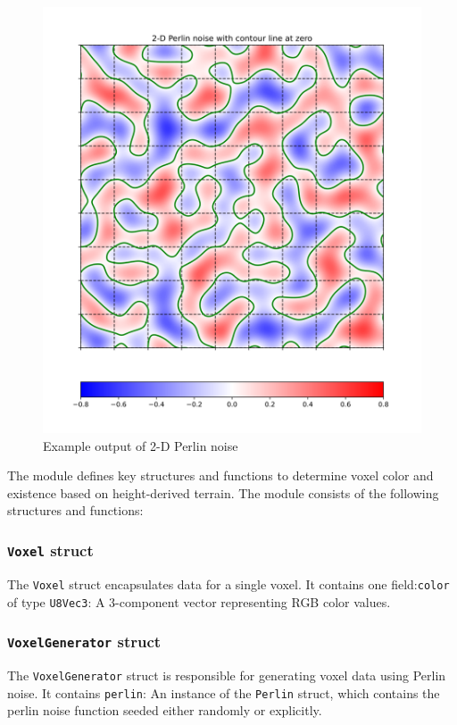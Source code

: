 \documentclass[conference]{IEEEtran}
\begin{document}
\begin{figure}[htbp]
\centerline{\includegraphics[width=\linewidth]{perlin-noise}}
\caption{Example output of 2-D Perlin noise}
\label{perlin-noise}
\end{figure}

The module defines key structures and functions to determine voxel color and existence based on height-derived terrain. The module consists of the following structures and functions:

\cprotect\subsubsection{\verb|Voxel| struct}
The \verb|Voxel| struct encapsulates data for a single voxel. It contains one field:\verb|color| of type \verb|U8Vec3|: A 3-component vector representing RGB color values.

\cprotect\subsubsection{\verb|VoxelGenerator| struct}
The \verb|VoxelGenerator| struct is responsible for generating voxel data using Perlin noise. It contains \verb|perlin|: An instance of the \verb|Perlin| struct, which contains the perlin noise function seeded either randomly or explicitly.
\end{document}
